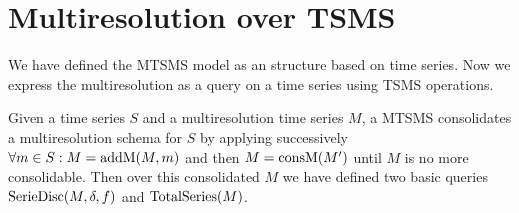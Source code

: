 











\section{Multiresolution over TSMS}

We have defined the MTSMS model as an structure based on time
series. Now we express the multiresolution as a query on a time series
using TSMS operations. 

Given a time series $S$ and a multiresolution time series $M$, a MTSMS
consolidates a multiresolution schema for $S$ by applying successively
$\forall m \in S: M=\operatorname{addM}(M,m)$ and then $M=\operatorname{consM}(M')$ until $M$ is
no more consolidable. Then over this consolidated $M$ we have defined
two basic queries $\operatorname{SerieDisc}(M,\delta,f)$ and $\operatorname{TotalSeries}(M)$.

